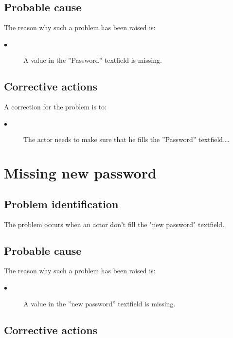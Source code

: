 \subsection{Probable cause}

The reason why such a problem has been raised is:\\
\begin{description}
\item[$\bullet$] A value in the ''Password'' textfield is missing.
\end{description}


\subsection{Corrective actions}

A correction for the problem is to:\\
\begin{description}
\item[$\bullet$] The actor needs to make sure that he fills the
''Password'' textfield.\ldots

\end{description}



\section{Missing new password} 

\subsection{Problem identification}
The problem occurs when an actor don't fill the "new password" textfield.

\subsection{Probable cause}

The reason why such a problem has been raised is:\\
\begin{description}
\item[$\bullet$] A value in the ''new password'' textfield is missing.
\end{description}


\subsection{Corrective actions}

